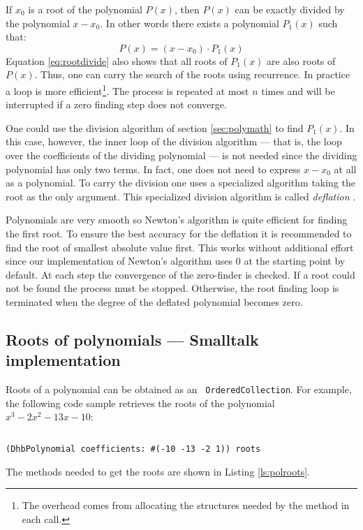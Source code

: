 \documentclass[twoside]{book}
\begin{document}
If $x_0$ is a root of the polynomial $P\left(x\right)$, then
$P\left(x\right)$ can be exactly divided by the polynomial
$x-x_0$. In other words there exists a polynomial
$P_1\left(x\right)$ such that:
\begin{equation}
\label{eq:rootdivide}
  P\left(x\right) = \left(x-x_0\right)\cdot P_1\left(x\right)
\end{equation}
Equation \ref{eq:rootdivide} also shows that all roots of
$P_1\left(x\right)$ are also roots of $P\left(x\right)$. Thus, one
can carry the search of the roots using recurrence. In practice a
loop is more efficient\footnote{The overhead comes from allocating
the structures needed by the method in each call.}. The process is
repeated at most $n$ times and will be interrupted if a zero
finding step does not converge.

One could use the division algorithm of section \ref{sec:polymath}
to find $P_1\left(x\right)$. In this case, however, the inner loop
of the division algorithm --- that is, the loop over the
coefficients of the dividing polynomial --- is not needed since
the dividing polynomial has only two terms. In fact, one does not
need to express $x-x_0$ at all as a polynomial. To carry the
division one uses a specialized algorithm taking the root as the
only argument. This specialized division algorithm is called {\sl
deflation} \cite{Press}.

Polynomials are very smooth so Newton's algorithm is quite
efficient for finding the first root. To ensure the best accuracy
for the deflation it is recommended to find the root of smallest
absolute value first. This works without additional effort since
our implementation of Newton's algorithm uses 0 at the starting
point by default. At each step the convergence of the zero-finder
is checked. If a root could not be found the process must be
stopped. Otherwise, the root finding loop is terminated when the
degree of the deflated polynomial becomes zero.

\subsection{Roots of polynomials --- Smalltalk implementation}
Roots of a polynomial can be obtained as an {\tt
OrderedCollection}. For example, the following code sample
retrieves the roots of the polynomial $x^3-2x^2-13x-10$:
\begin{codeExample}
\begin{verbatim}

\end{verbatim}
{\tt (DhbPolynomial coefficients: \#(-10 -13 -2 1)) roots}
\end{codeExample}
The methods needed to get the roots are shown in Listing
\ref{ls:polroots}.
\end{document}
